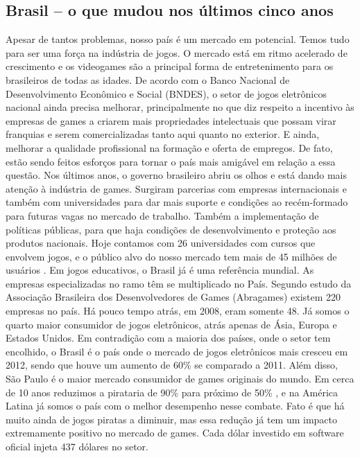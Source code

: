 \subsection{Brasil – o que mudou nos últimos cinco anos}
%
Apesar de tantos problemas, nosso país é um mercado em potencial. Temos tudo para ser uma força na indústria de jogos. O mercado está em ritmo acelerado de crescimento e os videogames são a principal forma de entretenimento para os brasileiros de todas as idades. De acordo com o Banco Nacional de Desenvolvimento Econômico e Social (BNDES)\cite{GEDIGames}, o setor de jogos eletrônicos nacional ainda precisa melhorar, principalmente no que diz respeito a incentivo às empresas de games a criarem mais propriedades intelectuais que possam virar franquias e serem comercializadas tanto aqui quanto no exterior. E ainda, melhorar a qualidade profissional na formação e oferta de empregos.
De fato, estão sendo feitos esforços para tornar o país mais amigável em relação a essa questão. Nos últimos anos, o governo brasileiro abriu os olhos e está dando mais atenção à indústria de games. Surgiram parcerias com empresas internacionais e também com universidades para dar mais suporte e condições ao recém-formado para futuras vagas no mercado de trabalho. Também a implementação de políticas públicas, para que haja condições de desenvolvimento e proteção aos produtos nacionais. Hoje contamos com 26 universidades com cursos que envolvem jogos, e o público alvo do nosso mercado tem mais de 45 milhões de usuários \cite{GEDIGames}. Em jogos educativos, o Brasil já é uma referência mundial.
As empresas especializadas no ramo têm se multiplicado no País. Segundo estudo da Associação Brasileira dos Desenvolvedores de Games (Abragames) existem 220 empresas no país. Há pouco tempo atrás, em 2008, eram somente 48.
Já somos o quarto maior consumidor de jogos eletrônicos, atrás apenas de Ásia, Europa e Estados Unidos. Em contradição com a maioria dos países, onde o setor tem encolhido, o Brasil é o país onde o mercado de jogos eletrônicos mais cresceu em 2012, sendo que houve um aumento de 60\% se comparado a 2011. Além disso, São Paulo é o maior mercado consumidor de games originais do mundo.
Em cerca de 10 anos reduzimos a pirataria de 90\% para próximo de 50\% \cite{GEDIGames}, e na América Latina já somos o país com o melhor desempenho nesse combate. Fato é que há muito ainda de jogos piratas a diminuir, mas essa redução já tem um impacto extremamente positivo no mercado de games. Cada dólar investido em software oficial injeta 437 dólares no setor.

